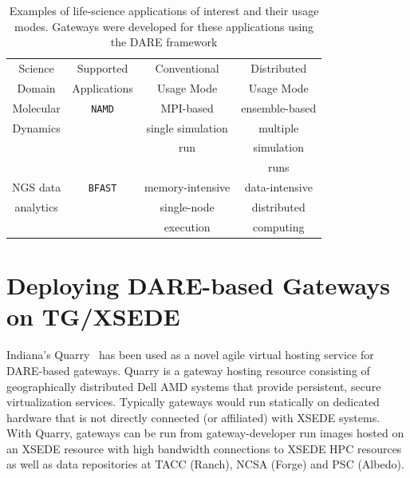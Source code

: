 \documentclass[]{svjour3}
\begin{document}
\begin{table}
\centering
 \small
\begin{tabular}{|c|c|c|c|} 
  \hline Science  & Supported  & Conventional   &   Distributed
  \\
  Domain & Applications & Usage Mode & Usage Mode\\ \hline \hline 
  
  Molecular   &  \texttt{NAMD} &  MPI-based  & ensemble-based   \\
  Dynamics  &  & single simulation  & multiple  \\ 
  &  & run &  simulation  \\ 
  &  &  &  runs \\ \hline
    NGS data     &  \texttt{BFAST} & memory-intensive  & data-intensive\\ 
  analytics  &  &  single-node   &  distributed  \\
  & & execution  & computing \\ \hline
    \hline
  \end{tabular} \caption{Examples of life-science applications of
    interest and their usage modes.  Gateways were developed for these
    applications using the DARE framework }
 \label{table:four-applications} 
\end{table}

\section{Deploying DARE-based Gateways on TG/XSEDE}

% 

Indiana's Quarry~\cite{quarry} has been used as a novel agile virtual
hosting service for DARE-based gateways. Quarry is a gateway hosting
resource consisting of geographically distributed Dell AMD systems
that provide persistent, secure virtualization services. Typically
gateways would run statically on dedicated hardware that is not
directly connected (or affiliated) with XSEDE systems. With Quarry,
gateways can be run from gateway-developer run images hosted on an
XSEDE resource with high bandwidth connections to XSEDE HPC resources
as well as data repositories at TACC (Ranch), NCSA (Forge) and PSC
(Albedo).
\end{document}
